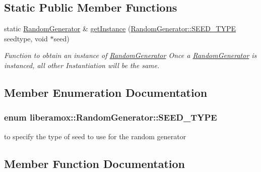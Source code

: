 \subsection*{Static Public Member Functions}
\begin{DoxyCompactItemize}
\item 
static \hyperlink{classliberamox_1_1RandomGenerator}{Random\+Generator} \& \hyperlink{classliberamox_1_1RandomGenerator_a37bec52482fedfa9edbee539c56f66ef}{get\+Instance} (\hyperlink{classliberamox_1_1RandomGenerator_ab60a70e0f015b364e905607690cac2d6}{Random\+Generator\+::\+S\+E\+E\+D\+\_\+\+T\+Y\+PE} seedtype, void $\ast$seed)
\begin{DoxyCompactList}\small\item\em Function to obtain an instance of \hyperlink{classliberamox_1_1RandomGenerator}{Random\+Generator} Once a \hyperlink{classliberamox_1_1RandomGenerator}{Random\+Generator} is instanced, all other Instantiation will be the same. \end{DoxyCompactList}\end{DoxyCompactItemize}


\subsection{Member Enumeration Documentation}
\subsubsection[{\texorpdfstring{S\+E\+E\+D\+\_\+\+T\+Y\+PE}{SEED_TYPE}}]{\setlength{\rightskip}{0pt plus 5cm}enum {\bf liberamox\+::\+Random\+Generator\+::\+S\+E\+E\+D\+\_\+\+T\+Y\+PE}}\hypertarget{classliberamox_1_1RandomGenerator_ab60a70e0f015b364e905607690cac2d6}{}\label{classliberamox_1_1RandomGenerator_ab60a70e0f015b364e905607690cac2d6}
to specify the type of seed to use for the random generator 

\subsection{Member Function Documentation}
